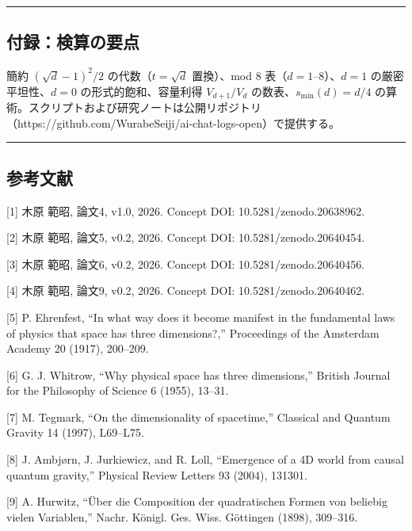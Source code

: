 \documentclass[
]{ltjsarticle}
\begin{document}
\begin{center}\rule{0.5\linewidth}{0.5pt}\end{center}

\subsection{付録：検算の要点}\label{ux4ed8ux9332ux691cux7b97ux306eux8981ux70b9}

簡約 \((\sqrt d-1)^2/2\) の代数（\(t=\sqrt d\) 置換）、mod 8
表（\(d=1\)--\(8\)）、\(d=1\) の厳密平坦性、\(d=0\)
の形式的飽和、容量利得 \(V_{d+1}/V_d\) の数表、\(s_{\min}(d)=d/4\)
の算術。スクリプトおよび研究ノートは公開リポジトリ（https://github.com/WurabeSeiji/ai-chat-logs-open）で提供する。

\begin{center}\rule{0.5\linewidth}{0.5pt}\end{center}

\subsection{参考文献}\label{ux53c2ux8003ux6587ux732e}

{[}1{]} 木原 範昭, 論文4, v1.0, 2026. Concept DOI:
10.5281/zenodo.20638962.

{[}2{]} 木原 範昭, 論文5, v0.2, 2026. Concept DOI:
10.5281/zenodo.20640454.

{[}3{]} 木原 範昭, 論文6, v0.2, 2026. Concept DOI:
10.5281/zenodo.20640456.

{[}4{]} 木原 範昭, 論文9, v0.2, 2026. Concept DOI:
10.5281/zenodo.20640462.

{[}5{]} P. Ehrenfest, ``In what way does it become manifest in the
fundamental laws of physics that space has three dimensions?,''
Proceedings of the Amsterdam Academy 20 (1917), 200--209.

{[}6{]} G. J. Whitrow, ``Why physical space has three dimensions,''
British Journal for the Philosophy of Science 6 (1955), 13--31.

{[}7{]} M. Tegmark, ``On the dimensionality of spacetime,'' Classical
and Quantum Gravity 14 (1997), L69--L75.

{[}8{]} J. Ambjørn, J. Jurkiewicz, and R. Loll, ``Emergence of a 4D
world from causal quantum gravity,'' Physical Review Letters 93 (2004),
131301.

{[}9{]} A. Hurwitz, ``Über die Composition der quadratischen Formen von
beliebig vielen Variablen,'' Nachr. Königl. Ges. Wiss. Göttingen (1898),
309--316.
\end{document}
